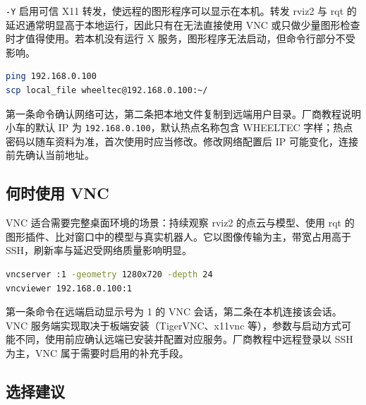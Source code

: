\passthrough{\lstinline!-Y!} 启用可信 X11
转发，使远程的图形程序可以显示在本机。转发 rviz2 与 rqt
的延迟通常明显高于本地运行，因此只有在无法直接使用 VNC
或只做少量图形检查时才值得使用。若本机没有运行 X
服务，图形程序无法启动，但命令行部分不受影响。

\begin{lstlisting}[language=bash]
ping 192.168.0.100
scp local_file wheeltec@192.168.0.100:~/
\end{lstlisting}

第一条命令确认网络可达，第二条把本地文件复制到远端用户目录。厂商教程说明小车的默认
IP 为 \passthrough{\lstinline!192.168.0.100!}，默认热点名称包含 WHEELTEC
字样；热点密码以随车资料为准，首次使用时应当修改。修改网络配置后 IP
可能变化，连接前先确认当前地址。

\subsection{何时使用 VNC}\label{ux4f55ux65f6ux4f7fux7528-vnc}

VNC 适合需要完整桌面环境的场景：持续观察 rviz2 的点云与模型、使用 rqt
的图形插件、比对窗口中的模型与真实机器人。它以图像传输为主，带宽占用高于
SSH，刷新率与延迟受网络质量影响明显。

\begin{lstlisting}[language=bash]
vncserver :1 -geometry 1280x720 -depth 24
vncviewer 192.168.0.100:1
\end{lstlisting}

第一条命令在远端启动显示号为 1 的 VNC 会话，第二条在本机连接该会话。VNC
服务端实现取决于板端安装（TigerVNC、x11vnc
等），参数与启动方式可能不同，使用前应确认远端已安装并配置对应服务。厂商教程中远程登录以
SSH 为主，VNC 属于需要时启用的补充手段。

\subsection{选择建议}\label{ux9009ux62e9ux5efaux8bae}


